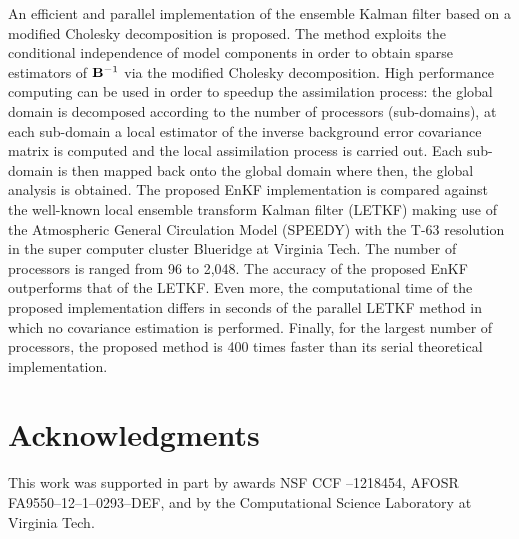 \documentclass[12pt]{article}
\newcommand{\B}{{\bf B}} \newcommand{\R}{{\bf R}} \newcommand{\N}{M} \newcommand{\y}{{\bf y}} \renewcommand{\H}{{\bf H}} \newcommand{\xm}{{\overline{\bf x}}} \newcommand{\xb}{{\bf x}^{\rm b}} \newcommand{\BAS}{{{\boldsymbol \Phi} }} \newcommand{\bas}{{{ \boldsymbol \phi} }} \newcommand{\w}{{\bf r}} \newcommand{\W}{{\boldsymbol \alpha}} \newcommand{\I}{{\bf I}} \newcommand{\M}{\mathcal{M}} \newcommand{\Nor}{\mathcal{N}} \newcommand{\Y}{{\bf Y}} \newcommand{\xt}{{\bf x}^{\rm true}} \newcommand{\Ho}{{\mathcal{H}}} \newcommand{\lle}{\left \{ } \newcommand{\rle}{\right \}} \newcommand{\dx}{{{\boldsymbol \delta} {\bf x}}}
\begin{document}
An efficient and parallel implementation of the ensemble Kalman filter based on a modified Cholesky decomposition is proposed. The method exploits the conditional independence of model components in order to obtain sparse estimators of $\B^{-1}$ via the modified Cholesky decomposition. High performance computing can be used in order to speedup the assimilation process: the global domain is decomposed according to the number of processors (sub-domains), at each sub-domain a local estimator of the inverse background error covariance matrix is computed and the local assimilation process is carried out. Each sub-domain is then mapped back onto the global domain where then, the global analysis is obtained. The proposed EnKF implementation is compared against the well-known local ensemble transform Kalman filter (LETKF) making use of the Atmospheric General Circulation Model (SPEEDY) with the T-63 resolution in the super computer cluster Blueridge at Virginia Tech. The number of processors is ranged from 96 to 2,048. The accuracy of the proposed EnKF outperforms that of the LETKF. Even more, the computational time of the proposed implementation differs in seconds of the parallel LETKF method in which no covariance estimation is performed. Finally, for the largest number of processors, the proposed method is 400 times faster than its serial theoretical implementation.



\section{Acknowledgments}

This work was supported in part by awards
NSF CCF --1218454,
AFOSR FA9550--12--1--0293--DEF,
and by the Computational Science Laboratory at Virginia Tech.
\end{document}
